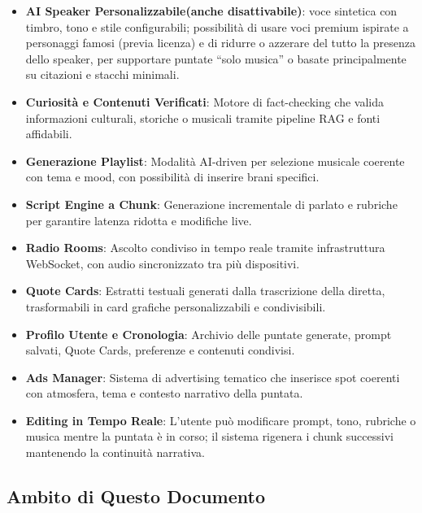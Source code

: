 \documentclass[11pt,a4paper]{article}
\begin{document}
\begin{itemize}
    \item \textbf{AI Speaker Personalizzabile(anche disattivabile)}: voce sintetica con timbro, tono e stile configurabili; possibilità di usare voci premium ispirate a personaggi famosi (previa licenza) e di ridurre o azzerare del tutto la presenza dello speaker, per supportare puntate “solo musica” o basate principalmente su citazioni e stacchi minimali.

    \item \textbf{Curiosità e Contenuti Verificati}:  
    Motore di fact-checking che valida informazioni culturali, storiche o musicali tramite pipeline RAG e fonti affidabili.

    \item \textbf{Generazione Playlist}:  
    Modalità AI-driven per selezione musicale coerente con tema e mood, con possibilità di inserire brani specifici.

    \item \textbf{Script Engine a Chunk}:  
    Generazione incrementale di parlato e rubriche per garantire latenza ridotta e modifiche live.

    \item \textbf{Radio Rooms}:  
    Ascolto condiviso in tempo reale tramite infrastruttura WebSocket, con audio sincronizzato tra più dispositivi.

    \item \textbf{Quote Cards}:  
    Estratti testuali generati dalla trascrizione della diretta, trasformabili in card grafiche personalizzabili e condivisibili.

    \item \textbf{Profilo Utente e Cronologia}:  
    Archivio delle puntate generate, prompt salvati, Quote Cards, preferenze e contenuti condivisi.

    \item \textbf{Ads Manager}:  
    Sistema di advertising tematico che inserisce spot coerenti con atmosfera, tema e contesto narrativo della puntata.

    \item \textbf{Editing in Tempo Reale}:  
    L’utente può modificare prompt, tono, rubriche o musica mentre la puntata è in corso; il sistema rigenera i chunk successivi mantenendo la continuità narrativa.
\end{itemize}

\subsection{Ambito di Questo Documento}
\end{document}
